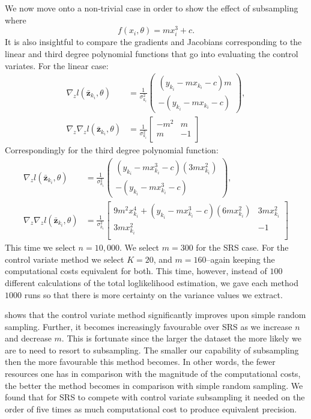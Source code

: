 We now move onto a non-trivial case in order to show the effect of subsampling where
%
\begin{equation}
    f(x_i,\theta) = mx_i^3+ c.
\label{eq:tertiary poly}
\end{equation}
%
It is also insightful to compare the gradients and Jacobians corresponding to the linear and third degree polynomial functions that go into evaluating the control variates. For the linear case:
%
\begin{align}
   \nabla_z l(\bar{\textbf{z}}_{k_{i}},\theta) &= \frac{1}{\sigma_{k_{i}}^2} \begin{pmatrix}(y_{k_{i}}-mx_{k_{i}}-c)m\\-(y_{k_{i}}-mx_{k_{i}}-c)\end{pmatrix},\\
   \nabla_z \nabla_z l(\bar{\textbf{z}}_{k_{i}},\theta) &=  \frac{1}{\sigma_{k_{i}}^2} \begin{bmatrix}
-m^2 & m \\
m & -1 \\
\end{bmatrix}
\end{align}
%
Correspondingly for the third degree polynomial function:
%
\begin{align}
   \nabla_z l(\bar{\textbf{z}}_{k_{i}},\theta) &= \frac{1}{\sigma_{k_{i}}^2} \begin{pmatrix}(y_{k_{i}}-mx_{k_{i}}^3-c)(3mx_{k_{i}}^2)\\-(y_{k_{i}}-mx_{k_{i}}^3-c)\end{pmatrix},\\
   \nabla_z \nabla_z l(\bar{\textbf{z}}_{k_{i}},\theta) &=  \frac{1}{\sigma_{k_{i}}^2} \begin{bmatrix}
9m^2x_{k_{i}}^4+(y_{k_{i}}-mx_{k_{i}}^3-c)(6mx_{k_{i}}^2) & 3mx_{k_{i}}^2 \\
3mx_{k_{i}}^2  & -1 \\
\end{bmatrix}
\end{align}
%
This time we select $n=10,000$. We select $m=300$ for the SRS case. For the control variate method we select $K=20$, and $m=160$--again keeping the computational costs equivalent for both. This time, however, instead of $100$ different calculations of the total loglikelihood estimation, we gave each method $1000$ runs so that there is more certainty on the variance values we extract.



 shows that the control variate method significantly improves upon simple random sampling. Further, it becomes increasingly favourable over SRS as we increase $n$ and decrease $m$. This is fortunate since the larger the dataset the more likely we are to need to resort to subsampling. The smaller our capability of subsampling then the more favourable this method becomes. In other words, the fewer resources one has in comparison with the magnitude of the computational costs, the better the method becomes in comparison with simple random sampling. We found that for SRS to compete with control variate subsampling it needed on the order of five times as much computational cost to produce equivalent precision. 

